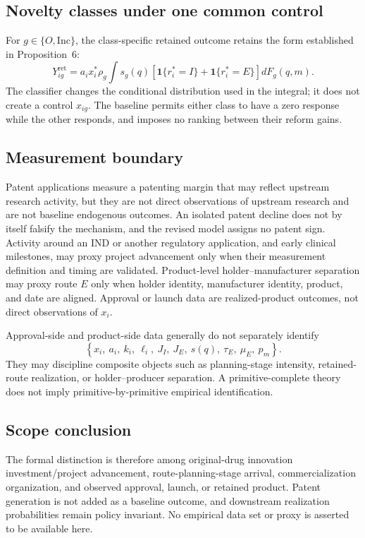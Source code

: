 \subsection{Novelty classes under one common control}
\label{subsec:p09-types}

For \(g\in\{O,\mathrm{Inc}\}\), the class-specific retained outcome retains
the form established in Proposition~6:
\begin{equation}
  Y_{ig}^{\mathrm{ret}}
  =
  a_ix_i^*\rho_g
  \int
  s_g(q)
  \left[
    \mathbf 1\{r_i^*=I\}
    +
    \mathbf 1\{r_i^*=E\}
  \right]
  dF_g(q,m).
  \label{eq:p09-type-mixture}
\end{equation}
The classifier changes the conditional distribution used in the integral; it
does not create a control \(x_{ig}\). The baseline permits either class to
have a zero response while the other responds, and imposes no ranking between
their reform gains.

\subsection{Measurement boundary}
\label{subsec:p09-measurement}

Patent applications measure a patenting margin that may reflect upstream
research activity, but they are not direct observations of upstream research
and are not baseline endogenous outcomes. An isolated patent decline does not
by itself falsify the mechanism, and the revised model assigns no patent sign.
Activity around an IND or another regulatory application, and early clinical
milestones, may proxy project advancement only when their measurement definition and
timing are validated.
Product-level holder--manufacturer separation may proxy route \(E\) only when
holder identity, manufacturer identity, product, and date are aligned.
Approval or launch data are realized-product outcomes, not direct observations
of \(x_i\).

Approval-side and product-side data generally do not separately identify
\begin{equation}
  \left\{
    x_i,\ a_i,\ k_i,\ \ell_i,\ J_I,\ J_E,\ s(q),\ \tau_E,\ \mu_E,\ p_m
  \right\}.
  \label{eq:p09-identification-boundary}
\end{equation}
They may discipline composite objects such as planning-stage intensity,
retained-route realization, or holder--producer separation. A
primitive-complete theory does not imply primitive-by-primitive empirical
identification.

\subsection{Scope conclusion}
\label{subsec:p09-scope}

The formal distinction is therefore among original-drug innovation
investment/project advancement, route-planning-stage arrival,
commercialization organization, and observed approval, launch, or retained
product. Patent generation is not added as a baseline outcome, and downstream
realization probabilities remain policy invariant. No empirical data set or
proxy is asserted to be available here.
